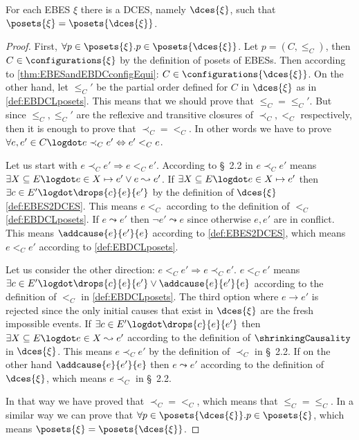 \documentclass[runningheads,a4paper]{llncs}
\begin{document}
\begin{lemma}
\label{lma:EBESintoEBDC}
For each EBES $\xi$ there is a DCES, namely $\dces{\xi}$, such that
$\posets{\xi} = \posets{\dces{\xi}}$.
\end{lemma}

\begin{proof}
First, $\forall p \in \posets{\xi}. p \in \posets{\dces{\xi}}$. Let $p = (C,
\leq_C)$, then $C\in \configurations{\xi}$ by the definition of posets of EBESs.
Then according to \theo\ref{thm:EBESandEBDCconfigEqui}: $C \in
\configurations{\dces{\xi}}$. On the other hand, let $\leq_C'$ be the partial
order defined for $C$ in $\dces{\xi}$ as in \ref{def:EBDCLposets}. This
means that we should prove that $\leq_C = \leq_C'$. But since $\leq_C, \leq_C'$
are the reflexive and transitive closures of $\prec_C, <_C$ respectively, then it is
enough to prove that $\prec_C = <_C$. In other words we have to prove
$\forall e,e'\in C \logdot e \prec_C e' \Leftrightarrow e'<_C e$.

Let us start with $e \prec_C e'\Longrightarrow e<_C e'$. According to 
\S~2.2 in \cite{dynamicCausality15} $e \prec_C e'$ means
$\exists X\subseteq E \logdot e \in X \mapsto e' \lor e\leadsto e'$. If $\exists X\subseteq E \logdot e \in X \mapsto e'$ then
$\exists c\in E' \logdot \drops{c}{e}{e'}$ by the definition of $\dces{\xi}$ \ref{def:EBES2DCES}. This means $e<_C$ according to the definition of $<_C$ \ref{def:EBDCLposets}.
If $e \leadsto e'$ then $ \neg e' \leadsto e$ since otherwise $e,e'$ are in conflict. This means
$\addcause{e}{e'}{e}$ according to \ref{def:EBES2DCES}, which means $e<_C e'$ according to \ref{def:EBDCLposets}.

Let us consider the other direction: $e <_C e'\Longrightarrow e\prec_C e'$.
$e<_C e'$ means $\exists c\in E' \logdot \drops{c}{e}{e'} \lor
\addcause{e}{e'}{e}$ according to the definition of $<_C$ in \ref{def:EBDCLposets}. The third option where $e\rightarrow e'$ is rejected
since the only initial causes that exist in $\dces{\xi}$ are the fresh
impossible events. If $\exists c\in E' \logdot \drops{c}{e}{e'}$ then $\exists X \subseteq E \logdot e\in X \leadsto
e'$ according to the definition of $\shrinkingCausality$ in $\dces{\xi}$. This
means $e \prec_C e'$ by the definition of $\prec_C$ in \S~2.2. If on the
other hand $\addcause{e}{e'}{e}$ then $e \leadsto e'$ according to the definition of
$\dces{\xi}$, which means $e \prec_C$ in \S~2.2.

In that way we have proved that $\prec_C = <_C$, which means that $\leq_C =
\leq_C$. In a similar way we can prove that $\forall p \in \posets{\dces{\xi}}. p
\in \posets{\xi}$, which means $\posets{\xi} = \posets{\dces{\xi}}$.
\end{proof}
\end{document}
